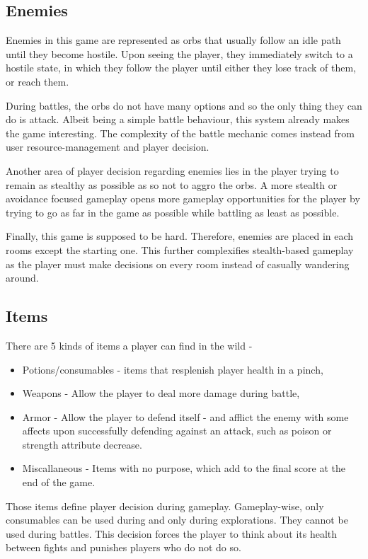 \documentclass[11pt]{article}
\begin{document}
\subsection{Enemies}
\label{sec:orga6e1054}
Enemies in this game are represented as orbs that usually follow an idle path until they become hostile.
Upon seeing the player, they immediately switch to a hostile state, in which they follow the player until either they lose
track of them, or reach them.

During battles, the orbs do not have many options and so the only thing they can do is attack. Albeit being a simple
battle behaviour, this system already makes the game interesting. The complexity of the battle mechanic comes instead from
user resource-management and player decision.

Another area of player decision regarding enemies lies in the player trying to remain as stealthy as possible as so not
to aggro the orbs. A more stealth or avoidance focused gameplay opens more gameplay opportunities for the player by trying
to go as far in the game as possible while battling as least as possible.

Finally, this game is supposed to be hard. Therefore, enemies are placed in each rooms except the starting one. This further
complexifies stealth-based gameplay as the player must make decisions on every room instead of casually wandering around.

\subsection{Items}
\label{sec:org4ac89bb}
There are 5 kinds of items a player can find in the wild -
\begin{itemize}
\item Potions/consumables - items that resplenish player health in a pinch,
\item Weapons - Allow the player to deal more damage during battle,
\item Armor - Allow the player to defend itself - and afflict the enemy with some affects upon successfully defending
against an attack, such as poison or strength attribute decrease.
\item Miscallaneous - Items with no purpose, which add to the final score at the end of the game.
\end{itemize}

Those items define player decision during gameplay. Gameplay-wise, only consumables can be used during and only during
explorations. They cannot be used during battles. This decision forces the player to think about its health between
fights and punishes players who do not do so.
\end{document}
